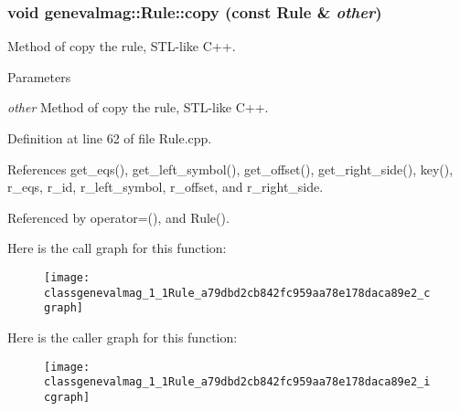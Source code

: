 \hypertarget{classgenevalmag_1_1Rule_a79dbd2cb842fc959aa78e178daca89e2}{
\subsubsection[{copy}]{\setlength{\rightskip}{0pt plus 5cm}void genevalmag::Rule::copy (const {\bf Rule} \& {\em other})}}
\label{classgenevalmag_1_1Rule_a79dbd2cb842fc959aa78e178daca89e2}
Method of copy the rule, STL-\/like C++. 
\begin{DoxyParams}{Parameters}
\item[{\em other}]Method of copy the rule, STL-\/like C++. \end{DoxyParams}


Definition at line 62 of file Rule.cpp.



References get\_\-eqs(), get\_\-left\_\-symbol(), get\_\-offset(), get\_\-right\_\-side(), key(), r\_\-eqs, r\_\-id, r\_\-left\_\-symbol, r\_\-offset, and r\_\-right\_\-side.



Referenced by operator=(), and Rule().



Here is the call graph for this function:\nopagebreak
\begin{figure}[H]
\begin{center}
\leavevmode
\texttt{[image: classgenevalmag\_1\_1Rule\_a79dbd2cb842fc959aa78e178daca89e2\_cgraph]}
\end{center}
\end{figure}




Here is the caller graph for this function:\nopagebreak
\begin{figure}[H]
\begin{center}
\leavevmode
\texttt{[image: classgenevalmag\_1\_1Rule\_a79dbd2cb842fc959aa78e178daca89e2\_icgraph]}
\end{center}
\end{figure}


